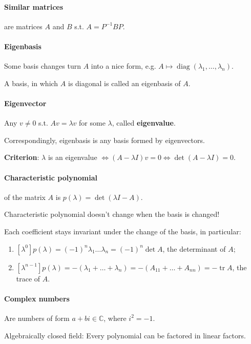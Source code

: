 \documentclass{article}
\begin{document}
\paragraph{Similar matrices} are matrices $A$ and $B$ s.t. $A = P^{-1} BP$.

\paragraph{Eigenbasis} Some basis changes turn $A$ into a nice form, e.g. $A \mapsto \operatorname{diag}(\lambda_1,\dots,\lambda_n)$.

A basis, in which $A$ is diagonal is called an eigenbasis of $A$.

\paragraph{Eigenvector} Any $v \neq 0$ s.t. $Av = \lambda v$ for some $\lambda$, called \textbf{eigenvalue}.


Correspondingly, eigenbasis is any basis formed by eigenvectors.

\textbf{Criterion}: $\lambda$ is an eigenvalue $\iff (A-\lambda I)v=0 \iff \det(A-\lambda I) =0$.

\paragraph{Characteristic polynomial} of the matrix $A$ is $p(\lambda)=\det(\lambda I - A)$.

Characteristic polynomial doesn't change when the basis is changed!

Each coefficient stays invariant under the change of the basis, in particular:

\begin{enumerate}
    \item $[\lambda^0] p(\lambda) = (-1)^n\lambda_1 \dots \lambda_n = (-1)^n\det A$, the determinant of $A$;
    \item $[\lambda^{n-1}]p(\lambda) = -(\lambda_1+\dots+\lambda_n) = -(A_{11}+\dots+A_{nn}) = -\operatorname{tr} A$, the trace of $A$.
\end{enumerate}

\paragraph{Complex numbers} Are numbers of form $a+bi \in \mathbb C$, where $i^2=-1$.

Algebraically closed field: Every polynomial can be factored in linear factors.
\end{document}
